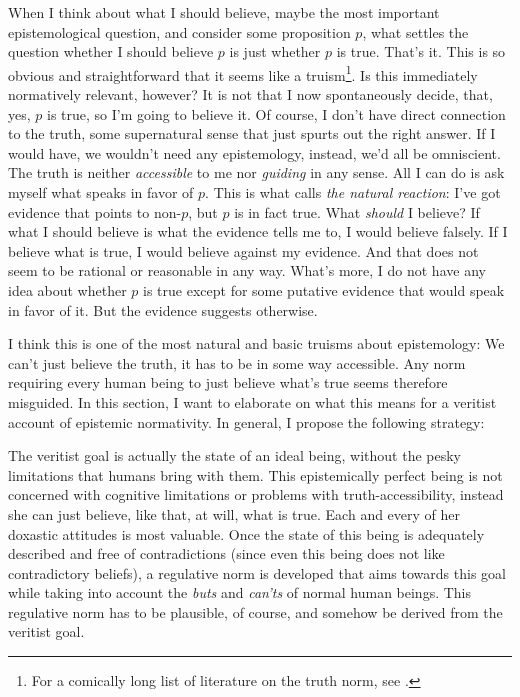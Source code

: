 \documentclass[12pt,numbers=noenddot]{scrartcl}
\begin{document}
When I think about what I should believe, maybe the most important epistemological question, and consider some proposition $p$, what settles the question whether I should believe $p$ is just whether $p$ is true. That's it. This is so obvious and straightforward that it seems like a truism\footnote{For a comically long list of literature on the truth norm, see \textcite[25]{Mchugh2012-MCHTTN}.}. Is this immediately normatively relevant, however? It is not that I now spontaneously decide, that, yes, $p$ is true, so I'm going to believe it. Of course, I don't have direct connection to the truth, some supernatural sense that just spurts out the right answer. If I would have, we wouldn't need any epistemology, instead, we'd all be omniscient. The truth is neither \emph{accessible} to me nor \emph{guiding} in any sense. All I can do is ask myself what speaks in favor of $p$. This is what \textcite{Gibbons2013-GIBTNO} calls \emph{the natural reaction}: I've got evidence that points to non-$p$, but $p$ is in fact true. What \emph{should} I believe? If what I should believe is what the evidence tells me to, I would believe falsely. If I believe what is true, I would believe against my evidence. And that does not seem to be rational or reasonable in any way. What's more, I do not have any idea about whether $p$ is true except for some putative evidence that would speak in favor of it. But the evidence suggests otherwise.

I think this is one of the most natural and basic truisms about epistemology: We can't just believe the truth, it has to be in some way accessible. Any norm requiring every human being to just believe what's true seems therefore misguided. In this section, I want to elaborate on what this means for a veritist account of epistemic normativity. In general, I propose the following strategy:

The veritist goal is actually the state of an ideal being, without the pesky limitations that humans bring with them. This epistemically perfect being is not concerned with cognitive limitations or problems with truth-accessibility, instead she can just believe, like that, at will, what is true. Each and every of her doxastic attitudes is most valuable. Once the state of this being is adequately described and free of contradictions (since even this being does not like contradictory beliefs), a regulative norm is developed that aims towards this goal while taking into account the \emph{buts} and \emph{can'ts} of normal human beings. This regulative norm has to be plausible, of course, and somehow be derived from the veritist goal.
\end{document}
